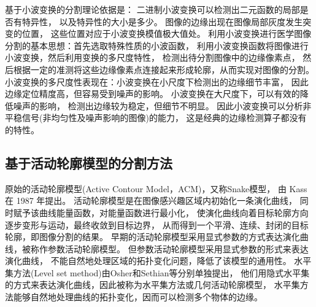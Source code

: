 基于小波变换的分割理论依据是：
二进制小波变换可以检测出二元函数的局部是否有特异性，
以及特异性的大小是多少。
图像的边缘出现在图像局部灰度发生突变的位置，
这些位置对应于小波变换模值极大值处。
利用小波变换进行医学图像分割的基本思想：首先选取特殊性质的小波函数，
利用小波变换函数将图像进行小波变换，然后利用变换的多尺度特性，
检测出待分割图像中的边缘像素点，
然后根据一定的准测将这些边缘像素点连接起来形成轮廓，从而实现对图像的分割。
小波变换的多尺度性表现在：小波变换在小尺度下检测出的边缘细节丰富，
因此边缘定位精度高，但容易受到噪声的影响。
小波变换在大尺度下，可以有效的降低噪声的影响，
检测出边缘较为稳定，但细节不明显。
因此小波变换可以分析非平稳信号(非均匀性及噪声影响的图像)的能力，
这是经典的边缘检测算子都没有的特性。

\subsection{基于活动轮廓模型的分割方法}
原始的活动轮廓模型(Active Contour  Model，ACM)，又称Snake模型，
由 Kass 在 1987 年提出。
活动轮廓模型是在图像感兴趣区域内初始化一条演化曲线，
同时赋予该曲线能量函数，对能量函数进行最小化，
使演化曲线向着目标轮廓方向逐步变形与运动，最终收敛到目标边界，
从而得到一个平滑、连续、封闭的目标轮廓，即图像分割的结果。
早期的活动轮廓模型采用显式参数的方式表达演化曲线，被称作参数活动轮廓模型。
但参数活动轮廓模型采用显式参数的形式来表达演化曲线，
不能自然地处理区域的拓扑变化问题，降低了该模型的通用性。
水平集方法(Level set method)由Osher和Sethian等分别单独提出，
他们用隐式水平集的方式来表达演化曲线，因此被称为水平集方法或几何活动轮廓模型，
水平集方法能够自然地处理曲线的拓扑变化，因而可以检测多个物体的边缘。

